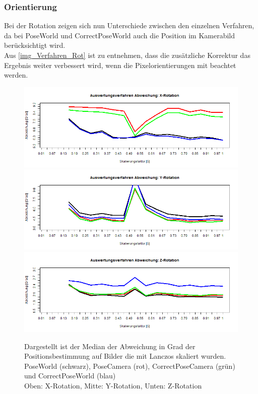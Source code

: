 \subsubsection{Orientierung}
Bei der Rotation zeigen sich nun Unterschiede zwischen den einzelnen Verfahren, da bei PoseWorld und CorrectPoseWorld auch die Position im Kamerabild berücksichtigt wird.\\
Aus \autoref{img_Verfahren_Rot} ist zu entnehmen, dass die zusätzliche Korrektur das Ergebnis weiter verbessert wird, wenn die Pixelorientierungen mit beachtet werden.
\begin{figure}
	\centering
	\includegraphics[width=\linewidth]{img_Skalierung/Verfahren_RX}
	\includegraphics[width=\linewidth]{img_Skalierung/Verfahren_RY}
	\includegraphics[width=\linewidth]{img_Skalierung/Verfahren_RZ}
	\caption{Dargestellt ist der Median der Abweichung in Grad der Positionsbestimmung auf Bilder die mit Lanczos skaliert wurden.\\
		PoseWorld (schwarz), PoseCamera (rot), CorrectPoseCamera (grün) und CorrectPoseWorld (blau)\\
		Oben: X-Rotation, Mitte: Y-Rotation, Unten: Z-Rotation}
	\label{img_Verfahren_Rot}
\end{figure}

